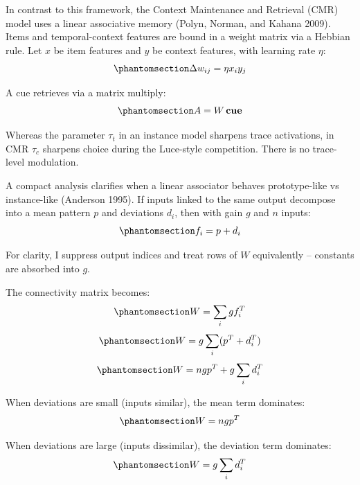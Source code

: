 \documentclass[
  letterpaper,
  11pt,
  english,
  singlespacing,
  headsepline]{MastersDoctoralThesis}
\begin{document}
In contrast to this framework, the Context Maintenance and Retrieval
(CMR) model uses a linear associative memory (Polyn, Norman, and Kahana
2009). Items and temporal-context features are bound in a weight matrix
via a Hebbian rule. Let \(x\) be item features and \(y\) be context
features, with learning rate \(\eta\):
\begin{equation}\phantomsection\label{eq-intro5}{
\Delta w_{ij} = \eta x_i y_j
}\end{equation}

A cue retrieves via a matrix multiply:
\begin{equation}\phantomsection\label{eq-intro6}{
A = W\,\mathbf{cue}
}\end{equation}

Whereas the parameter \(\tau_t\) in an instance model sharpens trace
activations, in CMR \(\tau_c\) sharpens choice during the Luce-style
competition. There is no trace-level modulation.

A compact analysis clarifies when a linear associator behaves
prototype-like vs instance-like (Anderson 1995). If inputs linked to the
same output decompose into a mean pattern \(p\) and deviations \(d_i\),
then with gain \(g\) and \(n\) inputs:
\begin{equation}\phantomsection\label{eq-intro7}{
f_i = p + d_i
}\end{equation}

For clarity, I suppress output indices and treat rows of \(W\)
equivalently -- constants are absorbed into \(g\).

The connectivity matrix becomes:
\begin{equation}\phantomsection\label{eq-intro8}{
W = \sum_i g f_i^T
}\end{equation} \begin{equation}\phantomsection\label{eq-intro9}{
W = g \sum_i (p^T + d_i^T)
}\end{equation} \begin{equation}\phantomsection\label{eq-intro10}{
W = ngp^T + g \sum_i d_i^T
}\end{equation}

When deviations are small (inputs similar), the mean term dominates:
\begin{equation}\phantomsection\label{eq-intro11}{
W = ngp^T
}\end{equation}

When deviations are large (inputs dissimilar), the deviation term
dominates: \begin{equation}\phantomsection\label{eq-intro12}{
W = g \sum_i d_i^T
}\end{equation}
\end{document}
